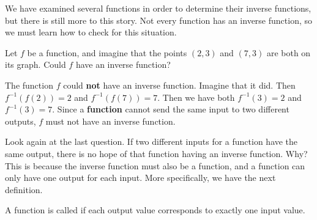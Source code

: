\documentclass{ximera}
\begin{document}
We have examined several functions in order to determine their inverse
functions, but there is still more to this story.  Not every function
has an inverse function, so we must learn how to check for this
situation.


\begin{question}
  Let $f$ be a function, and imagine that the points $(2,3)$ and
  $(7,3)$ are both on its graph.  Could $f$ have an inverse function?
  \begin{multipleChoice}
  \end{multipleChoice}
  \begin{feedback}
    The function $f$ could \textbf{not} have an inverse function.
    Imagine that it did.  Then $f^{-1}(f(2)) = 2$ and $f^{-1}(f(7)) =
    7$.  Then we have both $f^{-1}(3) = 2$ and $f^{-1}(3) = 7$.  Since
    a \textbf{function} cannot send the same input to two different
    outputs, $f$ must not have an inverse function.
  \end{feedback}
\end{question}


Look again at the last question.  If two different inputs for a
function have the same output, there is no hope of that function
having an inverse function.  Why?  This is because the inverse
function must also be a function, and a function can only have one
output for each input.  More specifically, we have the next
definition.

\begin{definition}
A function is called  if each output value corresponds
to exactly one input value.
\end{definition}
\end{document}
